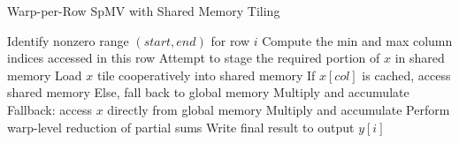 \documentclass[conference]{IEEEtran}
\begin{document}
\begin{algorithm*}[ht]
    \caption{Warp-per-Row SpMV with Shared Memory Tiling}
    \begin{algorithmic}[1]
            \State Identify nonzero range $(start, end)$ for row $i$
            \State Compute the min and max column indices accessed in this row
            \State Attempt to stage the required portion of $x$ in shared memory
                \State Load $x$ tile cooperatively into shared memory
                    \State If $x[col]$ is cached, access shared memory
                    \State Else, fall back to global memory
                    \State Multiply and accumulate
                \EndFor
            \Else
                \State Fallback: access $x$ directly from global memory
                    \State Multiply and accumulate
                \EndFor
            \EndIf
            \State Perform warp-level reduction of partial sums
            \State Write final result to output $y[i]$
        \EndFor
    \EndProcedure
    \end{algorithmic}
\end{algorithm*}
\end{document}
